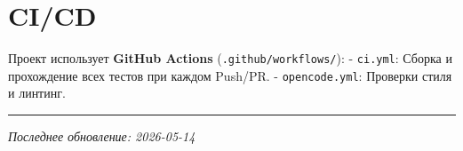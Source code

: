 \section{CI/CD}\label{cicd}

Проект использует \textbf{GitHub Actions} (\texttt{.github/workflows/}):
- \texttt{ci.yml}: Сборка и прохождение всех тестов при каждом Push/PR.
- \texttt{opencode.yml}: Проверки стиля и линтинг.

\begin{center}\rule{0.5\linewidth}{0.5pt}\end{center}

\emph{Последнее обновление: 2026-05-14}
